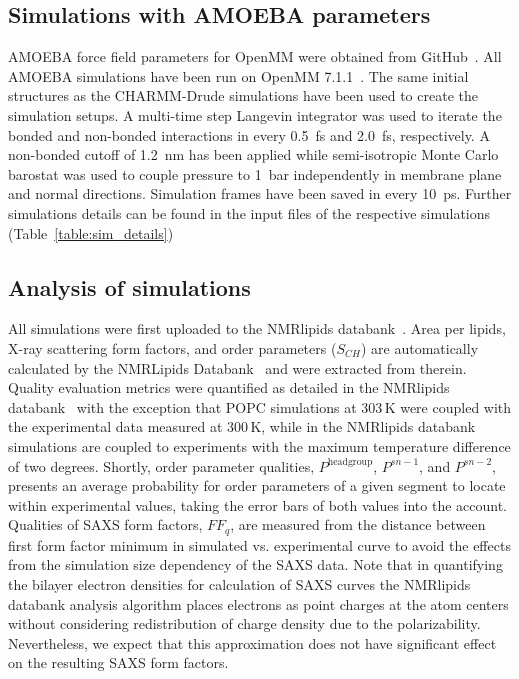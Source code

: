 \documentclass[journal=jacsat,manuscript=article,layout=singlecolumn]{achemso}
\begin{document}
\subsection{Simulations with AMOEBA parameters}

AMOEBA force field parameters for OpenMM were obtained from GitHub~\cite{amoebagithub,klesse2020induced}. All AMOEBA simulations have been run on OpenMM 7.1.1~\cite{eastman2017openmm}. The same initial structures as the CHARMM-Drude simulations have been used to create the simulation setups. A multi-time step Langevin integrator was used to iterate the bonded and non-bonded interactions in every 0.5~fs and 2.0~fs, respectively. A non-bonded cutoff of 1.2~nm has been applied while semi-isotropic Monte Carlo barostat was used to couple pressure to 1~bar independently in membrane plane and normal directions.
Simulation frames have been saved in every 10~ps. Further simulations details can be found in the input files of the respective simulations (Table~\ref{table:sim_details})


\subsection{Analysis of simulations}
 All simulations were first uploaded to the NMRlipids databank~\cite{Databank}. 
Area per lipids, X-ray scattering form factors, and order parameters ($S_{CH}$) are automatically calculated by the NMRLipids Databank~\cite{Databank} and were extracted from therein. Quality evaluation metrics were quantified as detailed in the NMRlipids databank~\cite{Databank} with the exception that POPC simulations at 303\,K were coupled with the experimental data measured at 300\,K, while in the NMRlipids databank simulations are coupled to experiments with the maximum temperature difference of two degrees. Shortly, order parameter qualities, $P^{\mathrm{headgroup}}$, $P^{sn-1}$, and $P^{sn-2}$, presents an average probability for order parameters of a given segment to locate within experimental values, taking the error bars of both values into the account. Qualities of SAXS form factors, $FF_{q}$, are measured from the distance between first form factor minimum in simulated vs. experimental curve to avoid the effects from the simulation size dependency of the SAXS data.
Note that in quantifying the bilayer electron densities for calculation of SAXS curves  the NMRlipids databank analysis algorithm places electrons as point charges at the atom centers without considering redistribution of charge density due to the polarizability. Nevertheless, we expect that this approximation does not have significant effect on the resulting SAXS form factors.
\end{document}
